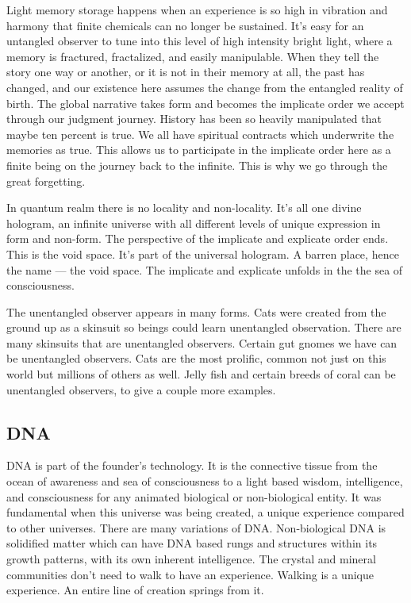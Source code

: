 \documentclass[letterpaper,11pt,twoside,titlepage,onecolumn,openany]{book}
\begin{document}
Light memory storage happens when an experience is so high in vibration
and harmony that finite chemicals can no longer be sustained. It's easy
for an untangled observer to tune into this level of high intensity
bright light, where a memory is fractured, fractalized, and easily
manipulable. When they tell the story one way or another, or it is not
in their memory at all, the past has changed, and our existence here
assumes the change from the entangled reality of birth. The global
narrative takes form and becomes the implicate order we accept through
our judgment journey. History has been so heavily manipulated that maybe
ten percent is true. We all have spiritual contracts which underwrite
the memories as true. This allows us to participate in the implicate
order here as a finite being on the journey back to the infinite. This
is why we go through the great forgetting.

In quantum realm there is no locality and non-locality. It's all one
divine hologram, an infinite universe with all different levels of
unique expression in form and non-form. The perspective of the implicate
and explicate order ends. This is the void space. It's part of the
universal hologram. A barren place, hence the name --- the void space.
The implicate and explicate unfolds in the the sea of consciousness.

The unentangled observer appears in many forms. Cats were created from
the ground up as a skinsuit so beings could learn unentangled
observation. There are many skinsuits that are unentangled observers.
Certain gut gnomes we have can be unentangled observers. Cats are the
most prolific, common not just on this world but millions of others as
well. Jelly fish and certain breeds of coral can be unentangled
observers, to give a couple more examples.

\subsection*{DNA}\label{dna}

DNA is part of the founder's technology. It is the connective tissue
from the ocean of awareness and sea of consciousness to a light based
wisdom, intelligence, and consciousness for any animated biological or
non-biological entity. It was fundamental when this universe was being
created, a unique experience compared to other universes. There are many
variations of DNA. Non-biological DNA is solidified matter which can
have DNA based rungs and structures within its growth patterns, with its
own inherent intelligence. The crystal and mineral communities don't
need to walk to have an experience. Walking is a unique experience. An
entire line of creation springs from it.
\end{document}
